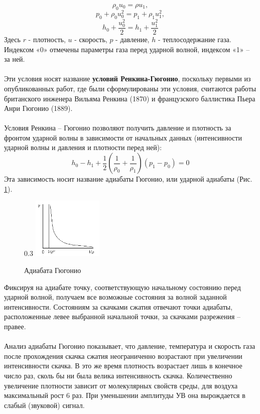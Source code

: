 \documentclass[14pt]{article}
\begin{document}
$$
\rho_{0} u_{0}=\rho u_{1}, 
$$
$$
p_{0}+\rho_{0} u_{0}^{2}=p_{1}+\rho_{1} u_{1}^{2},
$$
$$
h_{0}+\frac{u_{0}^{2}}{2}=h_{1}+\frac{u_{1}^{2}}{2}
$$
Здесь $r$ - плотность, $u$ - скорость, $p$ - давление, $h$ - теплосодержание газа. Индексом «0» отмечены параметры газа перед ударной волной, индексом «1» – за ней.\\ \\ Эти условия носят название \textbf{условий Ренкина-Гюгонио}, поскольку первыми из опубликованных работ, где были сформулированы эти условия, считаются работы британского инженера Вильяма Ренкина (1870) и французского баллистика Пьера Анри Гюгонио (1889).
\\ \\ Условия Ренкина – Гюгонио позволяют получить давление и плотность за фронтом ударной волны в зависимости от начальных данных (интенсивности ударной волны и давления и плотности перед ней):
$$
h_{0}-h_{1}+\frac{1}{2}\left(\frac{1}{\rho_{0}}+\frac{1}{\rho_{1}}\right)\left(p_{1}-p_{0}\right)=0
$$
Эта зависимость носит название адиабаты Гюгонио, или ударной адиабаты (Рис. \ref{fig:adia}).
\begin{figure}{0.3\textwidth} %
    \centering
    \includegraphics[width=0.3\textwidth]{img/adiabata.png}
    \caption{Адиабата Гюгонио}
    \label{fig:adia}
\end{figure}
Фиксируя на адиабате точку, соответствующую начальному состоянию перед ударной волной, получаем все возможные состояния за волной заданной интенсивности. Состояниям за скачками сжатия отвечают точки адиабаты, расположенные левее выбранной начальной точки, за скачками разрежения – правее. \\ \\Анализ адиабаты Гюгонио показывает, что давление, температура и скорость газа после прохождения скачка сжатия неограниченно возрастают при увеличении интенсивности скачка. В это же время плотность возрастает лишь в конечное число раз, сколь бы ни была велика интенсивность скачка. Количественно увеличение плотности зависит от молекулярных свойств среды, для воздуха максимальный рост 6 раз. При уменьшении амплитуды УВ она вырождается в слабый (звуковой) сигнал.
\end{document}
